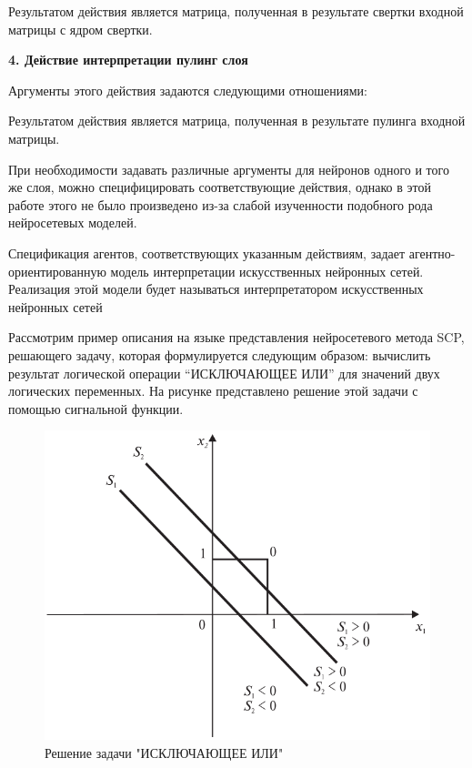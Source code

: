 Результатом действия является матрица, полученная в результате свертки входной матрицы с ядром свертки.


\textbf{4. Действие интерпретации пулинг слоя}

Аргументы этого действия задаются следующими отношениями:
\begin{SCn}



\end{SCn}

Результатом действия является матрица, полученная в результате пулинга входной матрицы.

При необходимости задавать различные аргументы для нейронов одного и того же слоя, можно специфицировать соответствующие действия, однако в этой работе этого не было произведено из-за слабой изученности подобного рода нейросетевых моделей.

Спецификация агентов, соответствующих указанным действиям, задает агентно-ориентированную модель интерпретации искусственных нейронных сетей. Реализация этой модели будет называться интерпретатором искусственных нейронных сетей

Рассмотрим пример описания на языке представления нейросетевого метода SCP, решающего задачу, которая формулируется следующим образом: вычислить результат логической операции ``ИСКЛЮЧАЮЩЕЕ ИЛИ'' для значений двух логических переменных. На рисунке \textit{} представлено решение этой задачи с помощью сигнальной функции.

\begin{figure}
	\centering
	\includegraphics[width=0.5\linewidth]{author/part3/figures/strong_or_graphic.png}
	\caption{Решение задачи "ИСКЛЮЧАЮЩЕЕ ИЛИ"{}}
	\label{fig:strong_or_graphic}
\end{figure}

